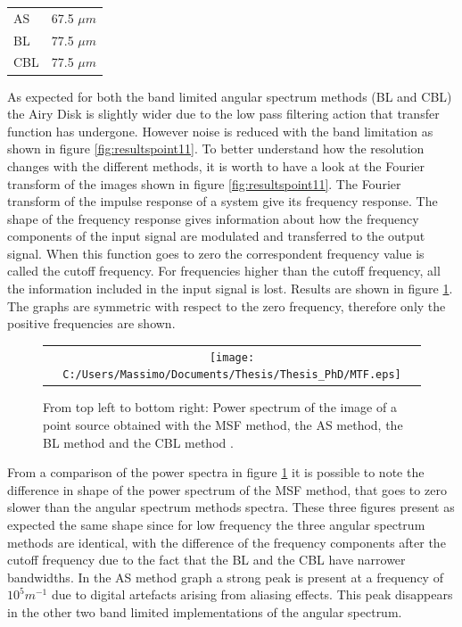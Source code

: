 	 \begin{center}
	 \begin{tabular}{ l | r }
	 	
	 	\hline			
	 	AS & 67.5 $\mu m$ \\
	 	BL & 77.5 $\mu m$ \\
	 	CBL & 77.5 $\mu m$ \\
	 	\hline 
	 		\end{tabular}
	\end{center}
	As expected for both the band limited angular spectrum methods (BL and CBL) the Airy Disk is slightly wider due to the low pass filtering action that transfer function has undergone. However noise is reduced with the band limitation as shown in figure
	 \ref{fig:resultspoint11}.
	 To better understand how the resolution changes with the different methods, it is worth to have a look at the Fourier transform of the images shown in figure \ref{fig:resultspoint11}. The Fourier transform of the impulse response of a system give its frequency response. The shape of the frequency response gives information about how the frequency components of the input signal are modulated and transferred to the output signal. When this function goes to zero the correspondent frequency value is called the cutoff frequency. For frequencies higher than the cutoff frequency, all the information included in the input signal is lost. Results are shown in figure \ref{fig:resultspoint2}. The graphs are symmetric with respect to the zero frequency, therefore only the positive frequencies are shown.
	 
	 \begin{figure}[h]
	 	\begin{center}
	 		\begin{tabular}{c}
	 			\texttt{[image: C:/Users/Massimo/Documents/Thesis/Thesis\_PhD/MTF.eps]}
	 		\end{tabular}
	 	\end{center}
	 	\caption{ \label{fig:resultspoint2} 
	 		From top left to bottom right: Power spectrum of the image of a point source obtained with the MSF method, the AS method, the BL method and the CBL method . }
	 \end{figure} 
	From a comparison of the power spectra in figure \ref{fig:resultspoint2} it is possible to note the difference in shape of the power spectrum of the MSF method, that goes to zero slower than the angular spectrum methods spectra. These three figures present as expected the same shape since for low frequency the three angular spectrum methods are identical, with the difference of the frequency components after the cutoff frequency due to the fact that the BL and the CBL have narrower bandwidths. In the AS method graph a strong peak is present at a frequency of $10^5 m^{-1}$ due to digital artefacts arising from aliasing effects. This peak disappears in the other two band limited implementations of the angular spectrum. 
